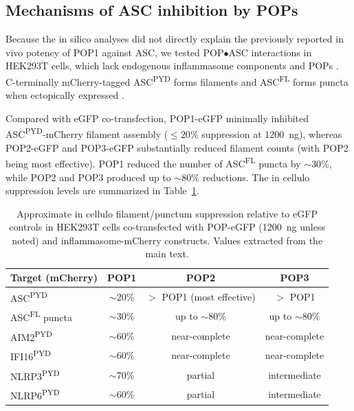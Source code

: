 \documentclass[11pt]{article}
\begin{document}
\subsection{Mechanisms of ASC inhibition by POPs}
Because the in silico analyses did not directly explain the previously reported in vivo potency of POP1 against ASC, we tested POP$\bullet$ASC interactions in HEK293T cells, which lack endogenous inflammasome components and POPs \citep{dealmeida2015,matyszewski2021,shi2016}. C-terminally mCherry-tagged ASC\textsuperscript{PYD} forms filaments and ASC\textsuperscript{FL} forms puncta when ectopically expressed \citep{matyszewski2021}.

Compared with eGFP co-transfection, POP1-eGFP minimally inhibited ASC\textsuperscript{PYD}-mCherry filament assembly ($\leq 20$\% suppression at 1200~ng), whereas POP2-eGFP and POP3-eGFP substantially reduced filament counts (with POP2 being most effective). POP1 reduced the number of ASC\textsuperscript{FL} puncta by $\sim 30$\%, while POP2 and POP3 produced up to $\sim 80$\% reductions. The in cellulo suppression levels are summarized in Table~\ref{tab:incellulo}.

\begin{table}[ht]
\centering
\small
\caption{Approximate in cellulo filament/punctum suppression relative to eGFP controls in HEK293T cells co-transfected with POP-eGFP (1200~ng unless noted) and inflammasome-mCherry constructs. Values extracted from the main text.}
\label{tab:incellulo}
\begin{tabular}{lccc}
\toprule
Target (mCherry) & POP1 & POP2 & POP3 \\
\midrule
ASC\textsuperscript{PYD}   & $\sim 20$\% & $>$ POP1 (most effective) & $>$ POP1 \\
ASC\textsuperscript{FL} puncta & $\sim 30$\% & up to $\sim 80$\% & up to $\sim 80$\% \\
AIM2\textsuperscript{PYD} & $\sim 60$\% & near-complete & near-complete \\
IFI16\textsuperscript{PYD} & $\sim 60$\% & near-complete & near-complete \\
NLRP3\textsuperscript{PYD} & $\sim 70$\% & partial & intermediate \\
NLRP6\textsuperscript{PYD} & $\sim 60$\% & partial & intermediate \\
\bottomrule
\end{tabular}
\end{table}
\end{document}
